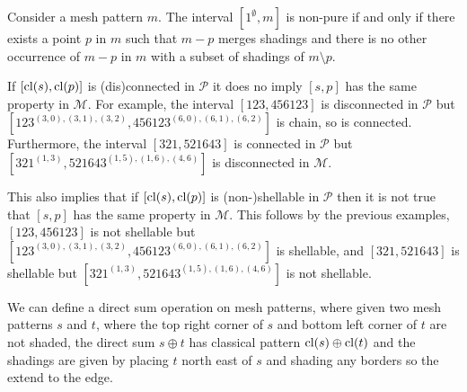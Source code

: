 \documentclass[11pt,a4paper,oneside]{article}
\begin{document}
\begin{prop}
Consider a mesh pattern $m$. The interval $[1^\emptyset,m]$ is non-pure if and only if there exists a point $p$ in $m$ such that $m-p$ merges shadings and there is no other occurrence of $m-p$ in $m$ with a subset of shadings of $m\setminus p$.
%
\end{prop}

If $[\operatorname{\textrm{cl}}(s),\operatorname{\textrm{cl}}(p)]$ is (dis)connected in $\mathcal{P}$ it does no imply $[s,p]$ has the same property in $\mathcal{M}$. For example, the interval $[123,456123]$ is disconnected in $\mathcal{P}$ but $[123^{(3,0),(3,1),(3,2)},456123^{(6,0),(6,1),(6,2)}]$ is chain, so is connected. Furthermore, the interval $[321,521643]$ is connected in $\mathcal{P}$ but $[321^{(1, 3)},521643^{(1, 5), (1, 6), (4, 6)}]$ is disconnected in $\mathcal{M}$.

This also implies that if $[\operatorname{\textrm{cl}}(s),\operatorname{\textrm{cl}}(p)]$ is (non-)shellable in $\mathcal{P}$ then it is not true that $[s,p]$ has the same property in $\mathcal{M}$. This follows by the previous examples, $[123,456123]$ is not shellable but $[123^{(3,0),(3,1),(3,2)},456123^{(6,0),(6,1),(6,2)}]$ is shellable, and $[321,521643]$ is shellable but $[321^{(1, 3)},521643^{(1, 5), (1, 6), (4, 6)}]$ is not shellable.

We can define a direct sum operation on mesh patterns, where given two mesh patterns $s$ and $t$, where the top right corner of $s$ and bottom left corner of $t$ are not shaded, the direct sum $s\oplus t$ has classical pattern $\operatorname{\textrm{cl}}(s)\oplus\operatorname{\textrm{cl}}(t)$ and the shadings are given by placing $t$ north east of $s$ and shading any borders so the extend to the edge.
\end{document}
